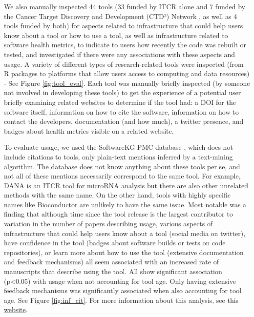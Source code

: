 \documentclass{article}
\begin{document}
We also manually inspected 44 tools (33 funded by ITCR alone and 7 funded by the Cancer Target Discovery and Development (CTD²) Network \cite{aksoy_ctd2_2017}, as well as 4 tools funded by both) for aspects related to infrastructure that could help users know about a tool or how to use a tool, as well as infrastructure related to software health metrics, to indicate to users how recently the code was rebuilt or tested, and investigated if there were any associations with these aspects and usage.  A variety of different types of research-related tools were inspected  (from R packages to platforms that allow users access to computing and data resources) - See Figure \ref{fig:tool_eval}. Each tool was manually briefly inspected (by someone not involved in developing these tools) to get the experience of a potential user briefly examining related websites to determine if the tool had: a DOI for the software itself, information on how to cite the software, information on how to contact the developers, documentation (and how much), a twitter presence, and badges about health metrics visible on a related website.

To evaluate usage, we used the SoftwareKG-PMC database \cite{Kruger_usage_20}, which does not include citations to tools, only plain-text mentions inferred by a text-mining algorithm. The database does not know anything about these tools per se, and not all of these mentions necessarily correspond to the same tool. For example, DANA is an ITCR tool for microRNA analysis but there are also other unrelated methods with the same name. On the other hand, tools with highly specific names like Bioconductor are unlikely to have the same issue. Most notable was a finding that although time since the tool release is the largest contributor to variation in the number of papers describing usage, various aspects of infrastructure that could help users know about a tool (social media on twitter), have confidence in the tool (badges about software builds or tests on code repositories), or learn more about how to use the tool (extensive documentation and feedback mechanisms) all seem associated with an increased rate of manuscripts that describe using the tool. All show significant association (p<0.05) with usage when not accounting for tool age. Only having extensive feedback mechanisms was significantly associated when also accounting for tool age. See Figure \ref{fig:inf_cit}. For more information about this analysis, see this \href{https://hutchdatascience.org/ITCR_Metrics_manuscript_website/}{website}.
\end{document}

